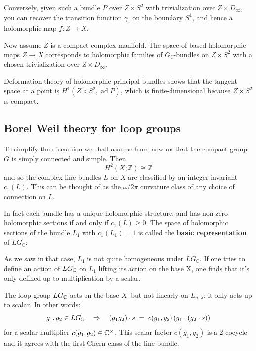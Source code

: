 \documentclass[12pt]{article}
\begin{document}
\begin{remark}
    Conversely, given such a bundle $P$ over $Z \times S^2$ with trivialization over $Z \times D_\infty$, you can recover the transition function $\gamma_z$ on the boundary $S^1$, and hence a holomorphic map $f: Z \to X$. 

    Now assume $Z$ is a compact complex manifold. The space of based holomorphic maps $Z \to X$ corresponds to holomorphic families of $G_\mathbb{C}$-bundles on $Z \times S^2$ with a chosen trivialization over $Z \times D_\infty$.

     Deformation theory of holomorphic principal bundles shows that the tangent space at a point is $H^1(Z \times S^2, \operatorname{ad} P)$, which is finite-dimensional because $Z \times S^2$ is compact.
\end{remark}
\subsection{Borel Weil theory for loop groups}
To simplify the discussion we shall assume from now on that the compact group \(G\) is simply connected and simple.
Then \[H^2(X;\mathbb{Z}) \cong \mathbb{Z}\]
and so the complex line bundles \(L\) on \(X\) are classified by an integer invariant \(c_1(L)\). This can be thought of as the $\omega/2\pi$ curvature class of any choice of connection on \(L\).

In fact each bundle has a unique holomorphic structure,
and has non-zero holomorphic sections if and only if \(c_1(L) \ge 0\).
The space of holomorphic sections of the bundle \(L_1\) with \(c_1(L_1) = 1\)
is called the \textbf{basic representation} of \(LG_{\mathbb{C}}\):


As we saw in that case, \(L_1\) is not quite homogeneous under \(LG_{\mathbb{C}}\). If one tries to define an action of \(LG_{\mathbb{C}}\) on $L_1$ lifting its action on the base X, one finds that it's only defined up to multiplication by a scalar.

The loop group \(LG_{\mathbb{C}}\) acts on the base $X$, but not linearly on \(L_{n,\lambda}\); it only acts up to scalar.
In other words:
\[
g_1,g_2 \in LG_{\mathbb{C}}
\quad \Rightarrow \quad
(g_1g_2)\cdot s
\;=\;
c(g_1,g_2)\,(g_1\cdot(g_2\cdot s))
\]
for a scalar multiplier \(c(g_1,g_2) \in \mathbb{C}^\times\). This scalar factor $c(g_1,g_2)$ is a 2-cocycle and it agrees with the first Chern class of the line bundle.
\end{document}
